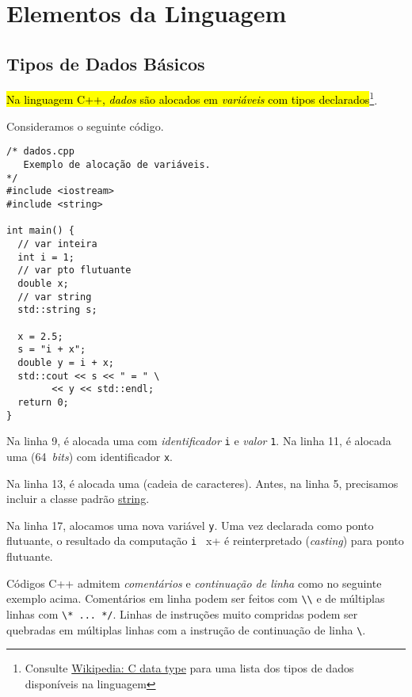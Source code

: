 \documentclass[12pt]{article}
\begin{document}
\section{Elementos da Linguagem}\label{sec_elem}

\subsection{Tipos de Dados Básicos}

\hl{Na linguagem C++, \emph{dados} são alocados em \emph{variáveis} com tipos declarados}\footnote{Consulte \href{https://en.wikipedia.org/wiki/C_data_types}{Wikipedia: C data type} para uma lista dos tipos de dados disponíveis na linguagem}.

\begin{ex}
  Consideramos o seguinte código.
\begin{lstlisting}[caption=dados.cpp]
/* dados.cpp
   Exemplo de alocação de variáveis.
*/
#include <iostream>
#include <string>

int main() {
  // var inteira
  int i = 1;
  // var pto flutuante
  double x;
  // var string
  std::string s;

  x = 2.5;
  s = "i + x";
  double y = i + x;
  std::cout << s << " = " \
	    << y << std::endl;
  return 0;
}
\end{lstlisting}

  Na linha 9, é alocada uma  com \emph{identificador} \lstinline+i+ e \emph{valor} \lstinline+1+. Na linha 11, é alocada uma  (64~\textit{bits}) com identificador \lstinline+x+.

  Na linha 13, é alocada uma  (cadeia de caracteres). Antes, na linha 5, precisamos incluir a classe padrão \href{https://cplusplus.com/reference/string/string/}{string}.

  Na linha 17, alocamos uma nova variável \lstinline+y+. Uma vez declarada como ponto flutuante, o resultado da computação \lstinline+i + x+ é reinterpretado (\textit{casting}) para ponto flutuante.
\end{ex}

\begin{obs}
  Códigos C++ admitem \emph{comentários} e \emph{continuação de linha} como no seguinte exemplo acima. Comentários em linha podem ser feitos com \lstinline+\\+ e de múltiplas linhas com \lstinline+\* ... */+. Linhas de instruções muito compridas podem ser quebradas em múltiplas linhas com a instrução de continuação de linha \lstinline+\+.
\end{obs}
\end{document}
